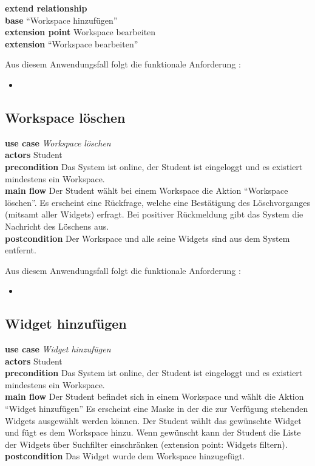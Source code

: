 \textbf{extend relationship}\\
\textbf{base} "`Workspace hinzufügen"'\\
\textbf{extension point} Workspace bearbeiten\\
\textbf{extension} "`Workspace bearbeiten"'
 
Aus diesem Anwendungsfall folgt die funktionale Anforderung :
\begin{itemize}
 \item \requirement{\requirementWorkspaceEdit}\label{requirementWorkspaceEdit}
\end{itemize}
 
\subsection{Workspace löschen}
\textbf{use case} \emph{Workspace löschen}\\
\textbf{actors} Student\\
\textbf{precondition} Das System ist online, der Student ist eingeloggt und es existiert mindestens ein Workspace.\\
\textbf{main flow} Der Student wählt bei einem Workspace die Aktion "`Workspace löschen"'. Es erscheint eine Rückfrage, welche eine Bestätigung des Löschvorganges (mitsamt aller Widgets) erfragt. Bei positiver Rückmeldung gibt das System die Nachricht des Löschens aus. \\
\textbf{postcondition} Der Workspace und alle seine Widgets sind aus dem System entfernt.
 
Aus diesem Anwendungsfall folgt die funktionale Anforderung :
\begin{itemize}
 \item \requirement{\requirementWorkspaceDelete}\label{requirementWorkspaceDelete}
\end{itemize}

\subsection{Widget hinzufügen}
\textbf{use case} \emph{Widget hinzufügen}\\
\textbf{actors} Student\\
\textbf{precondition} Das System ist online, der Student ist eingeloggt und es existiert mindestens ein Workspace.\\
\textbf{main flow} Der Student befindet sich in einem Workspace und wählt die Aktion "`Widget hinzufügen"' Es erscheint eine Maske in der die zur Verfügung stehenden Widgets ausgewählt werden können. Der Student wählt das gewünschte Widget und fügt es dem Workspace hinzu. Wenn gewünscht kann der Student die Liste der Widgets über Suchfilter einschränken (extension point: Widgets filtern).\\
\textbf{postcondition} Das Widget wurde dem Workspace hinzugefügt.


